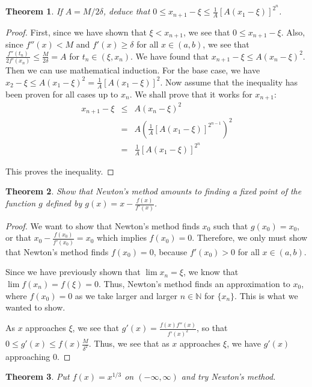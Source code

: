 \documentclass[psamsfonts]{amsart}
\newtheorem{thm}{Theorem}[section]
\theoremstyle{definition}
\theoremstyle{remark}
\numberwithin{equation}{section}
\begin{document}
\begin{thm}
If $A = M/2\delta$, deduce that $ 0 \leq x_{n+1} - \xi \leq \frac{1}{A} [A(x_1 - \xi)]^{2^n}$. 
\end{thm}

\begin{proof}
First, since we have shown that $ \xi < x_{n+1}$, we see that $0 \leq x_{n+1} - \xi$. Also, since $f''(x) < M$ and $f'(x) \geq \delta$ for all $x \in (a,b)$, we see that $\frac{f''(t_n)}{2 f'(x_n)} \leq \frac{M}{2 \delta} = A$ for $t_n \in (\xi, x_n)$. We have found that $x_{n+1} - \xi \leq A(x_n - \xi)^2$. Then we can use mathematical induction. For the base case, we have $x_2 - \xi \leq A(x_1 - \xi)^2 = \frac{1}{A} [A(x_1 - \xi)]^2$. Now assume that the inequality has been proven for all cases up to $x_n$. We shall prove that it works for $x_{n+1}$:
\begin{eqnarray}
x_{n+1} - \xi &\leq& A(x_n - \xi)^2 \\
&=& A \left(\frac{1}{A} [A(x_1 - \xi)]^{2^{n-1}} \right)^2 \\
&=& \frac{1}{A} [A(x_1 - \xi)]^{2^n}
\end{eqnarray}

This proves the inequality.
\end{proof}

\begin{thm}
Show that Newton's method amounts to finding a fixed point of the function $g$ defined by $g(x) = x - \frac{f(x)}{f'(x)}$.
\end{thm}

\begin{proof}
We want to show that Newton's method finds $x_0$ such that $g(x_0) = x_0$, or that $x_0 - \frac{f(x_0)}{f'(x_0)} = x_0$ which implies $f(x_0) = 0$. Therefore, we only must show that Newton's method finds $f(x_0) = 0$, because $f'(x_0) > 0$ for all $x \in (a,b)$. 

Since we have previously shown that $\lim x_n = \xi$, we know that $\lim f(x_n) = f(\xi) = 0$. Thus, Newton's method finds an approximation to $x_0$, where $f(x_0) = 0$ as we take larger and larger $n \in \mathbb{N}$ for $\{ x_n \}$. This is what we wanted to show. 

As $x$ approaches $\xi$, we see that $g'(x) = \frac{ f(x) f''(x)}{f'(x)^2}$, so that $0 \leq g'(x) \leq f(x) \frac{M}{\delta^2}$. Thus, we see that as $x$ approaches $\xi$, we have $g'(x)$ approaching $0$. 
\end{proof}

\begin{thm}
Put $f(x) = x^{1/3}$ on $(-\infty, \infty)$ and try Newton's method. 
\end{thm}
\end{document}
